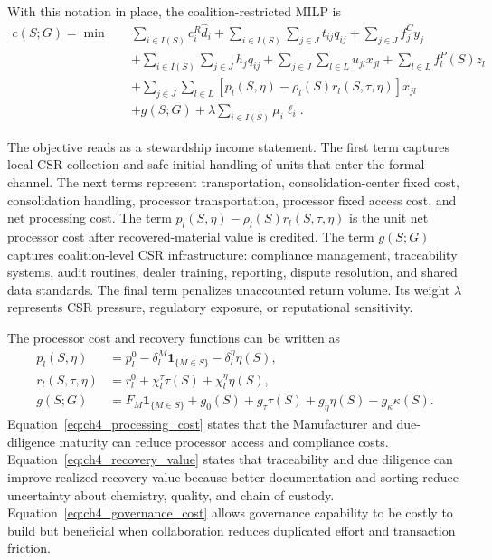 With this notation in place, the coalition-restricted MILP is
\begin{equation}
\label{eq:objective}
\begin{aligned}
c(S;G)=\min \quad
& \sum_{i\in I(S)} c_i^R \widehat d_i
+ \sum_{i\in I(S)}\sum_{j\in J} t_{ij}q_{ij}
+ \sum_{j\in J} f_j^C y_j \\
& + \sum_{i\in I(S)}\sum_{j\in J} h_j q_{ij}
+ \sum_{j\in J}\sum_{l\in L} u_{jl}x_{jl}
+ \sum_{l\in L} f_l^P(S)z_l \\
& + \sum_{j\in J}\sum_{l\in L}\left[p_l(S,\eta)-\rho_l(S) r_l(S,\tau,\eta)\right]x_{jl}\\
& + g(S;G)
 + \lambda\sum_{i\in I(S)}\mu_i\ell_i .
\end{aligned}
\end{equation}

The objective reads as a stewardship income statement. The first term captures local CSR collection and safe initial handling of units that enter the formal channel. The next terms represent transportation, consolidation-center fixed cost, consolidation handling, processor transportation, processor fixed access cost, and net processing cost. The term $p_l(S,\eta)-\rho_l(S)r_l(S,\tau,\eta)$ is the unit net processor cost after recovered-material value is credited. The term $g(S;G)$ captures coalition-level CSR infrastructure: compliance management, traceability systems, audit routines, dealer training, reporting, dispute resolution, and shared data standards. The final term penalizes unaccounted return volume. Its weight $\lambda$ represents CSR pressure, regulatory exposure, or reputational sensitivity.

The processor cost and recovery functions can be written as
\begin{align}
\label{eq:ch4_processing_cost}
p_l(S,\eta)
&=p_l^0-\delta_l^M\mathbf{1}_{\{M\in S\}}-\delta_l^\eta\eta(S),\\
\label{eq:ch4_recovery_value}
r_l(S,\tau,\eta)
&=r_l^0+\chi_l^\tau\tau(S)+\chi_l^\eta\eta(S),\\
\label{eq:ch4_governance_cost}
g(S;G)
&=F_M\mathbf{1}_{\{M\in S\}}+g_0(S)+g_\tau\tau(S)+g_\eta\eta(S)-g_\kappa\kappa(S).
\end{align}
Equation~\eqref{eq:ch4_processing_cost} states that the Manufacturer and due-diligence maturity can reduce processor access and compliance costs. Equation~\eqref{eq:ch4_recovery_value} states that traceability and due diligence can improve realized recovery value because better documentation and sorting reduce uncertainty about chemistry, quality, and chain of custody. Equation~\eqref{eq:ch4_governance_cost} allows governance capability to be costly to build but beneficial when collaboration reduces duplicated effort and transaction friction.


